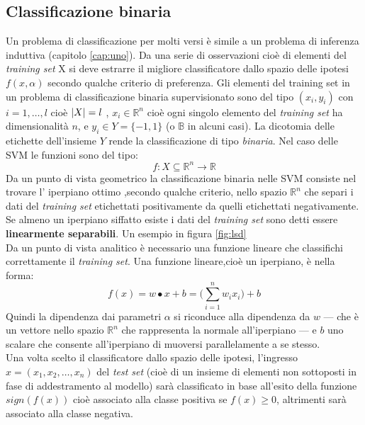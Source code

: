 \subsection{Classificazione binaria}
\label{sub:clb}
Un problema di classificazione per molti versi è simile a un problema di inferenza induttiva (capitolo \ref{cap:uno}). Da una serie di osservazioni cioè di elementi del \textit{training set} X si deve estrarre il migliore classificatore dallo spazio delle ipotesi $f(x,\alpha)$ secondo qualche criterio di preferenza. Gli elementi del training set in un problema di classificazione binaria supervisionato sono del tipo $(x_i , y_i)$ con $i=1,\dots,l$ cioè $\lvert X\rvert=l$ , $x_i \in \mathbb{R}^{n}$ cioè ogni singolo elemento del \textit{training set} ha dimensionalità $n$, e $y_i \in Y=\{-1,1\}$ (o $\mathbb{B}$ in alcuni casi). La dicotomia delle etichette dell'insieme $Y$ rende la classificazione di tipo \textit{binaria}.
 Nel caso delle \ac{SVM} le funzioni sono del tipo:
\begin{equation*}
f : X \subseteq \mathbb{R}^{n} \to \mathbb{R}
\end{equation*}
Da un punto di vista geometrico la classificazione binaria nelle \ac{SVM} consiste nel trovare l' iperpiano ottimo ,secondo qualche criterio, nello spazio $\mathbb{R}^n$  che separi i dati del \textit{training set} etichettati positivamente da quelli etichettati negativamente. Se almeno un iperpiano siffatto esiste i dati del \textit{training set} sono detti essere \textbf{linearmente separabili}. Un esempio in figura \ref{fig:lsd}\\
Da un punto di vista analitico è necessario una funzione lineare che classifichi correttamente il \textit{training set}. Una funzione lineare,cioè un iperpiano,  è nella forma:
\begin{equation*}
f(x) = w \bullet x +b = \Biggl(\sum_{i=1}^{n}w_{i}x_{i}\Biggl) + b
\end{equation*}
Quindi la dipendenza dai parametri $\alpha$ si riconduce alla dipendenza da $w$ --- che è un vettore nello spazio $\mathbb{R}^n$ che rappresenta la normale all'iperpiano --- e $b$ uno scalare che consente all'iperpiano di muoversi parallelamente a se stesso.\\  
Una volta scelto il classificatore dallo spazio delle ipotesi, l'ingresso $x=(x_1,x_2,\dots,x_n) $ del \textit{test set} (cioè di un insieme di elementi non sottoposti in fase di addestramento al modello) sarà classificato in base all'esito della funzione $sign(f(x))$ cioè associato alla classe positiva se $f(x) \geq 0$, altrimenti sarà associato alla classe negativa.
 
